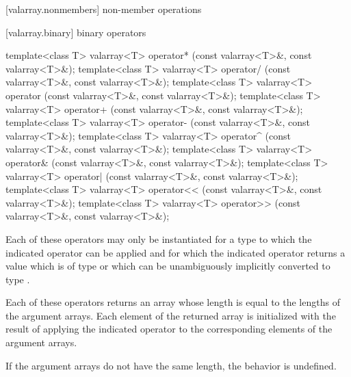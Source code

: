 [valarray.nonmembers]{ non-member operations}

[valarray.binary]{ binary operators}

%
%
%
%
%
%
%
%
%
%
%
%
\begin{itemdecl}
template<class T> valarray<T> operator*
    (const valarray<T>&, const valarray<T>&);
template<class T> valarray<T> operator/
    (const valarray<T>&, const valarray<T>&);
template<class T> valarray<T> operator%
    (const valarray<T>&, const valarray<T>&);
template<class T> valarray<T> operator+
    (const valarray<T>&, const valarray<T>&);
template<class T> valarray<T> operator-
    (const valarray<T>&, const valarray<T>&);
template<class T> valarray<T> operator^
    (const valarray<T>&, const valarray<T>&);
template<class T> valarray<T> operator&
    (const valarray<T>&, const valarray<T>&);
template<class T> valarray<T> operator|
    (const valarray<T>&, const valarray<T>&);
template<class T> valarray<T> operator<<
    (const valarray<T>&, const valarray<T>&);
template<class T> valarray<T> operator>>
    (const valarray<T>&, const valarray<T>&);
\end{itemdecl}

\begin{itemdescr}
\pnum
Each of these operators may only be instantiated for a type 
to which the indicated operator can be applied and for which the indicated
operator returns a value which is of type  or which
can be unambiguously implicitly converted to type .

\pnum
Each of these operators returns an array whose length is equal to the
lengths of the argument arrays.
Each element of the returned array is
initialized with the result of applying the indicated operator to the
corresponding elements of the argument arrays.

\pnum
If the argument arrays do not have the same length, the behavior is undefined.%
\end{itemdescr}


